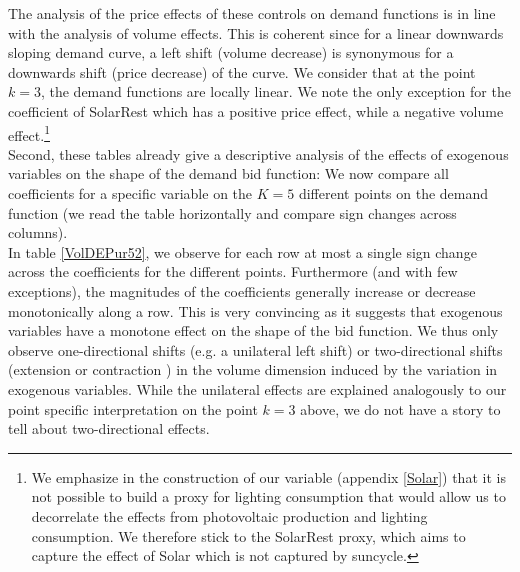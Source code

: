 The analysis of the price effects of these controls on demand functions is in line with the analysis of volume effects. This is coherent since for a linear downwards sloping demand curve, a left shift (volume decrease) is synonymous for a downwards shift (price decrease) of the curve. We consider that at the point $k=3$, the demand functions are locally linear. We note the only exception for the coefficient of SolarRest which has a positive price effect, while a negative volume effect.\footnote{We emphasize in the construction of our variable (appendix \ref{Solar}) that it is not possible to build a proxy for lighting consumption that would allow us to decorrelate the effects from photovoltaic production and lighting consumption. We therefore stick to the SolarRest proxy, which aims to capture the effect of Solar which is not captured by suncycle.} \\

Second, these tables already give a descriptive analysis of the effects of exogenous variables on the shape of the demand bid function:
We now compare all coefficients for a specific variable on the $K=5$ different points on the demand function (we read the table horizontally and compare sign changes across columns).\\

In table \ref{VolDEPur52}, we observe for each row at most a single sign change across the coefficients for the different points. Furthermore (and with few exceptions), the magnitudes of the coefficients generally increase or decrease monotonically along a row. 
This is very convincing as it suggests that exogenous variables have a monotone effect on the shape of the bid function. We thus only observe one-directional shifts (e.g. a unilateral left shift) or two-directional shifts (extension or contraction%
) in the volume dimension induced by the variation in exogenous variables. While the unilateral effects are explained analogously to our point specific interpretation on the point $k=3$ above, we do not have a story to tell about two-directional effects.\\

